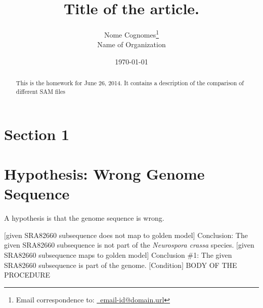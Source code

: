\documentclass[letter,12pt]{article}
\begin{document}
\title{Title of the article.}
\date{\today}
\author{Nome Cognomes\thanks{Email correspondence to: \href{mailto:email-id@domain.url}{\Email\ email-id@domain.url}}\\
	Name of Organization
}
\maketitle


\begin{abstract} 
This is the homework for June 26, 2014. It contains a description of the comparison of different SAM files
\end{abstract}





\section{Section 1}
\label{sec:mysection1}


\section{Hypothesis: Wrong Genome Sequence}
\label{sec:HypothesisWrongGenomeSequence}


A hypothesis is that the genome sequence is wrong.


\begin{codebox}
\label{lst:LABEL}
\zi {}
\li	\If $[$given SRA82660 subsequence does not map to golden model$]$
	\Then
\li		Conclusion: The given SRA82660 subsequence is not part of the {\it Neurospora crassa} species.
\li	\ElseIf $[$given SRA82660 subsequence maps to golden model$]$
	\Then
\li		Conclusion \#1: The given SRA82660 subsequence is part of the genome.
\li	\ElseNoIf $[$Condition$]$
\li	
\li	\Else
\li	
	\End
\li BODY OF THE PROCEDURE
\zi	{}
\li	\Return
\end{codebox}
\end{document}
